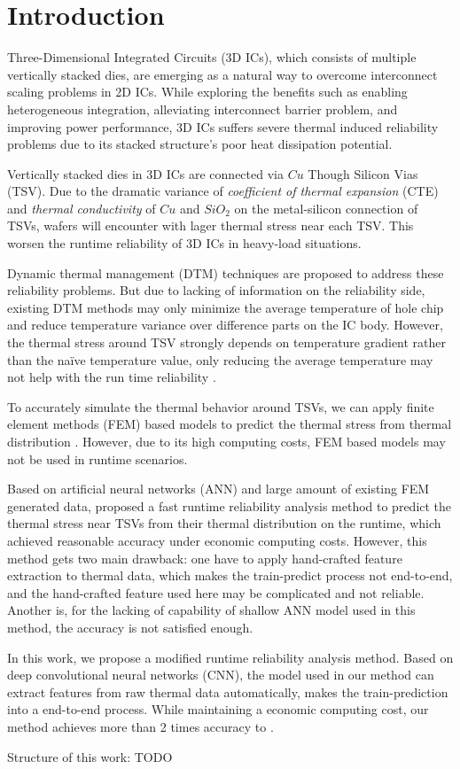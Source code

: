 
\chapter{Introduction}
Three-Dimensional Integrated Circuits (3D ICs),
which consists of multiple vertically stacked dies, 
are emerging as a natural way to overcome interconnect scaling problems in 2D ICs.
While exploring the benefits such as enabling heterogeneous integration, 
alleviating interconnect barrier problem, and improving power performance, 
3D ICs suffers severe thermal induced reliability problems due to its
stacked structure's poor heat dissipation potential.

Vertically stacked dies in 3D ICs are connected via $Cu$ Though Silicon Vias (TSV)\cite{Beyne2008Through}. 
Due to the dramatic variance of 
\textit{coefficient of thermal expansion} (CTE) and \textit{thermal conductivity}
of $Cu$ and $SiO_2$ on the metal-silicon connection of TSVs, 
wafers will encounter with lager thermal stress near each TSV.
This worsen the runtime reliability of 3D ICs in heavy-load situations.

Dynamic thermal management (DTM) techniques are proposed to address these reliability
problems. But due to lacking of information on the reliability side, existing DTM 
methods may only minimize the average temperature of hole chip and reduce temperature
variance over difference parts on the IC body\cite{Zou2013Thermomechanical}.
However, the thermal stress around TSV strongly depends on temperature gradient rather
than the na\"ive temperature value, only reducing the average temperature may not help with
the run time reliability \cite{Zhang2016Fast}.

To accurately simulate the thermal behavior around TSVs, we can apply finite element methods (FEM)
based models to predict the thermal stress from thermal distribution \cite{Lu2009Thermo}. 
However, due to its high computing costs, FEM based models may not be used in runtime scenarios.

Based on artificial neural networks (ANN) and large amount of existing FEM generated data, 
\cite{Zhang2016Fast} proposed a fast runtime reliability analysis method to predict the 
thermal stress near TSVs from their thermal distribution on the
runtime, which achieved reasonable accuracy under economic computing costs.
However, this method gets two main drawback: one have to apply hand-crafted feature extraction to
thermal data, which makes the train-predict process not end-to-end, and the hand-crafted feature used here
may be complicated and not reliable. Another is, 
for the lacking of capability of shallow ANN model used in this method, 
the accuracy is not satisfied enough.

In this work, we propose a modified runtime reliability analysis method.
Based on deep convolutional neural networks (CNN), the model used in our method can extract features from raw
thermal data automatically, makes the train-prediction into a end-to-end process.
While maintaining a economic computing cost, our method achieves more than 2 times accuracy to \cite{Zhang2016Fast}.

Structure of this work: TODO

